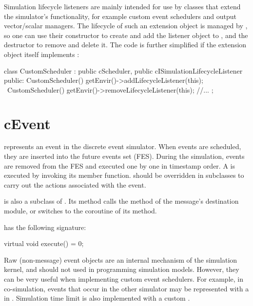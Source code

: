 Simulation lifecycle listeners are mainly intended for use by classes that
extend the simulator's functionality, for example custom event schedulers
and output vector/scalar managers. The lifecycle of such an extension
object is managed by {\opp}, so one can use their constructor to create and
add the listener object to , and the destructor to remove
and delete it. The code is further simplified if the extension object
itself implements :

\begin{cpp}
class CustomScheduler : public cScheduler, public cISimulationLifecycleListener
{
  public:
    CustomScheduler() { getEnvir()->addLifecycleListener(this); }
    ~CustomScheduler() { getEnvir()->removeLifecycleListener(this); }
    //...
};
\end{cpp}


\section{cEvent}
\label{sec:plugin-exts:cevent}

 represents an event in the discrete event simulator. When
events are scheduled, they are inserted into the future events set (FES).
During the simulation, events are removed from the FES and executed one by
one in timestamp order. A  is executed by invoking its
 member function.  should be overridden
in subclasses to carry out the actions associated with the event.

\begin{note}
 is also a subclass of . Its
 method calls the  method of the
message's destination module, or switches to the coroutine of its
 method.
\end{note}

 has the following signature:

\begin{cpp}
virtual void execute() = 0;
\end{cpp}

Raw (non-message) event objects are an internal mechanism of the {\opp}
simulation kernel, and should not used in programming simulation models.
However, they can be very useful when implementing custom event schedulers.
For example, in co-simulation, events that occur in the other simulator may
be represented with a  in {\opp}. Simulation time limit
is also implemented with a custom .


